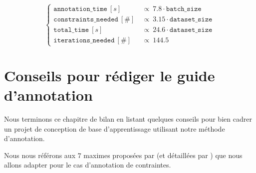		\begin{equation}
			\label{equation:5.5-GUIDE-COUTS}
			\begin{cases}
				\texttt{annotation\_time}~[s] &
					~\propto~7.8 \cdot \texttt{batch\_size} \\
				\texttt{constraints\_needed}~[\#] &
					~\propto~3.15 \cdot \texttt{dataset\_size} \\
				\texttt{total\_time}~[s] &
					~\propto~24.6 \cdot \texttt{dataset\_size} \\
				\texttt{iterations\_needed}~[\#] &
					~\propto~144.5
			\end{cases}
		\end{equation}
	
	
	\newpage
	\section{Conseils pour rédiger le guide d'annotation}
		\label{section:5.6-GUIDE-REDIGER}
		
		Nous terminons ce chapitre de bilan en listant quelques conseils pour bien cadrer un projet de conception de base d'apprentissage utilisant notre méthode d'annotation.
		\begin{leftBarInformation}
			Nous nous référons aux $7$ maximes proposées par \cite{leech:1993:corpus-annotation-schemes} (et détaillées par \cite{fort:2022:manual-annotation-what}) que nous allons adapter pour le cas d'annotation de contraintes.
		\end{leftBarInformation}
		
